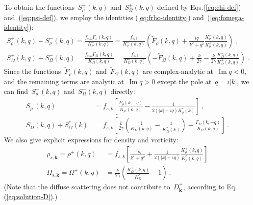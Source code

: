 \documentclass[preprint,aps,eqsecnum]{revtex4-1}
\newcommand{\fplus}[1]{{#1}^{+}}
\newcommand{\fminus}[1]{{#1}^{-}}
\newcommand{\fplusminus}[1]{{#1}^{\pm}}
\renewcommand{\Im}{\mathop{\mathrm{Im}}\nolimits}
\begin{document}
To obtain the
functions~$\fplusminus{S}_{\rho}(k, q)$
and~$\fplusminus{S}_\Omega(k, q)$ defined
by Eqs.(\ref{eq:chi-def}) and~(\ref{eq:psi-def}), we employ
the identities (\ref{eq:frho-identity}) and~(\ref{eq:fomega-identity}):
\begin{align}
  \fplus{S}_\rho(k, q) + \fminus{S}_\rho(k, q)
   = \frac{f_{s, k} F_\rho(k, q)}{\fminus{K}_\rho(k, q)}
  = \frac{f_{s, k}}{\fminus{K}_\rho(k, q)} \left( \tilde{F}_\rho(k, q)
      + \frac{iq}{k^2 + q^2} \frac{\fminus{K}_\rho(k, q)}{\fplus{K}_\rho(k, q)}\right)
  \ ,
\\
\fplus{S}_\Omega(k, q) + \fminus{S}_\Omega(k, q)
= \frac{f_{s, k} F_\Omega(k, q)}{\fminus{K}_\Omega(k, q)}
= \frac{f_{s, k}}{\fminus{K}_\Omega(k, q)} \left( - \tilde{F}_\Omega(k, q)
      + \frac{k}{2\gamma}
      - \frac{k}{2\gamma}\frac{\fminus{K}_\Omega(k, q)}{\fplus{K}_\Omega(k, q)}\right)
\ .
\end{align}
Since the functions~$\tilde{F}_\rho(k, q)$ and~$\tilde{F}_\Omega(k, q)$
are complex-analytic at~$\Im q < 0$, and the remaining terms are analytic
at~$\Im q > 0$ except the pole at~$q = i |k|$,
we can find~$\fminus{S}_\rho(k, q)$ and~$\fminus{S}_\Omega(k, q)$ directly:
\begin{align}
  \fminus{S}_\rho(k, q) &= f_{s, k} \left[
  \frac{{F}_\rho(k, -q)}{\fminus{K}_\rho(k, q)}
  - \frac{1}{2(|k| + iq) K_\rho^\ast(k)}
  \right]
  \ ,
  \\
  \fminus{S}_\Omega(k, q) + S_\Omega^\ast(k)
  &= f_{s, k}\left[\frac{k}{2\gamma} \left(\frac{1}{\fminus{K}_\Omega(k, q)}
  - \frac{1}{K_\Omega^\ast(k)} \right)
   - \frac{F_\Omega(k, -q)}{\fminus{K}_\Omega(k, q)}  \right]
  \ .
\end{align}
We also give explicit expressions for density and vorticity:
\begin{align}
  \label{eq:rho-s}
  \rho_{s, {\bm k}} = \fplus{\rho}(k, q) &= f_{s, k} \left[\frac{-iq}{k^2 + q^2}
  + \frac{1}{2(|k| + iq)} \frac{\fplus{K}_\rho(k, q)}{K_\rho^\ast(k, q)} \right]
  \\
   \label{eq:omega-s}
  \Omega_{s, {\bm k}} = \fplus{\Omega}(k, q)
  &= \frac{k}{2\gamma}
     \left(\frac{\fplus{K}_\Omega(k, q)}{K_\Omega^\ast} - 1\right)
  \ .
\end{align}
(Note that the diffuse scattering does not contribute to~$\fplus{D}_{\bm k}$,
according to Eq.(\ref{eq:solution-D}).)
\end{document}
